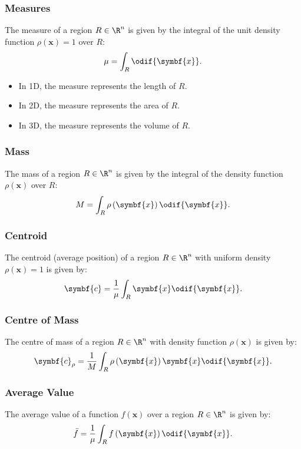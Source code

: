 \documentclass{article}
\begin{document}
\subsubsection{Measures}
The measure of a region \(R \in \R^n\) is given by the integral of the
unit density function \(\rho\left( \symbf{x} \right) = 1\) over \(R\):
\begin{equation*}
    \mu = \int_R \odif{\symbf{x}}.
\end{equation*}
\begin{itemize}
    \item In 1D, the measure represents the length of \(R\).
    \item In 2D, the measure represents the area of \(R\).
    \item In 3D, the measure represents the volume of \(R\).
\end{itemize}
\subsubsection{Mass}
The mass of a region \(R \in \R^n\) is given by the integral of the
density function \(\rho\left( \symbf{x} \right)\) over \(R\):
\begin{equation*}
    M = \int_R \rho\left( \symbf{x} \right) \odif{\symbf{x}}.
\end{equation*}
\subsubsection{Centroid}
The centroid (average position) of a region \(R \in \R^n\) with uniform
density \(\rho\left( \symbf{x} \right) = 1\) is given by:
\begin{equation*}
    \symbf{c} = \frac{1}{\mu} \int_R \symbf{x} \odif{\symbf{x}}.
\end{equation*}
\subsubsection{Centre of Mass}
The centre of mass of a region \(R \in \R^n\) with density function
\(\rho\left( \symbf{x} \right)\) is given by:
\begin{equation*}
    \symbf{c}_{\rho} = \frac{1}{M} \int_R \rho\left( \symbf{x} \right) \symbf{x} \odif{\symbf{x}}.
\end{equation*}
\subsubsection{Average Value}
The average value of a function \(f\left( \symbf{x} \right)\) over a
region \(R \in \R^n\) is given by:
\begin{equation*}
    \bar{f} = \frac{1}{\mu} \int_R f\left( \symbf{x} \right) \odif{\symbf{x}}.
\end{equation*}
\end{document}
